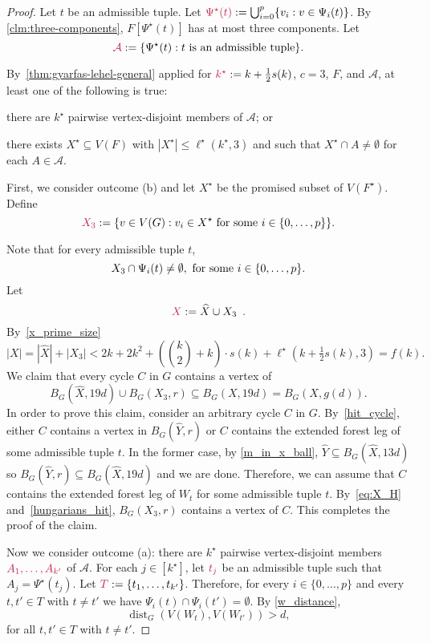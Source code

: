 \documentclass{patmorin}
\DeclareMathOperator{\dist}{dist}
\DeclarePairedDelimiter\set{\{}{\}}
\begin{document}
\begin{proof}
Let $t$ be an admissible tuple.
Let $\mathdefin{\Psi^\star(t)}:=\bigcup_{i=0}^p \{v_i:v\in \Psi_i(t)\}$.
By \cref{clm:three-components}, $F[\Psi^\star(t)]$ has at most three components.
Let
\[
\mathdefin{\mathcal{A}}:=\{\Psi^\star(t):\text{$t$ is an admissible tuple}\}.
\]

By~\cref{thm:gyarfas-lehel-general} applied for
$\mathdefin{k^\star}:=k+\tfrac{1}{2}s(k)$, $c=3$, $F$, and $\mathcal{A}$, at least one of the following is true:
\begin{enumerate*}[label=(\alph*),ref=\alph*]
  \item there are $k^\star$ pairwise vertex-disjoint members of $\mathcal{A}$; or
  \item there exists $X^\star\subseteq V(F)$ with $|X^\star|\leq \ell^\star(k^\star,3)$ and such that $X^\star \cap A\neq\emptyset$ for each $A\in \mathcal{A}$.
\end{enumerate*}

First, we consider outcome (b) and let $X^\star$ be the promised subset of $V(F^\star)$.
Define
\[
\mathdefin{X_3}:=\set{v\in V(G):v_i\in X^\star \textrm{ for some $i\in\set{0,\ldots,p}$}}.
\]


Note that
for every admissible tuple $t$,
\begin{equation}\label{eq:X_H}
X_3 \cap \Psi_i(t) \neq\emptyset,\ \textrm{for some $i\in\set{0,\ldots,p}$.}
\end{equation}
Let
\[
\mathdefin{X}:=\widehat{X} \cup X_3 \enspace .
\]
By~\eqref{x_prime_size}
\[
|X| = |\widehat{X}| + |X_3| < \textstyle 2k + 2k^2 + (\binom{k}{2}+k)\cdot s(k) +  \ell^\star(k+\tfrac{1}{2}s(k),3) = f(k).
\]
We claim that every cycle $C$ in $G$ contains a vertex of
\[
B_G(\widehat{X},19d)\cup B_G(X_3,r)\subseteq B_G(X,19d) = B_G(X,g(d)).
\]
In order to prove this claim, consider an arbitrary cycle $C$ in $G$.
By~\cref{hit_cycle}, either $C$ contains a vertex in $B_G(\widehat{Y},r)$ or $C$ contains the extended forest leg of some admissible tuple $t$.
In the former case, by \eqref{m_in_x_ball}, $\widehat{Y}\subseteq B_G(\widehat{X},13d)$ so $B_G(\widehat{Y},r)\subseteq B_G(\widehat{X},19d)$  and we are done.
Therefore, we can assume that $C$ contains the extended forest leg of $W_t$ for some admissible tuple $t$.
By~\eqref{eq:X_H} and~\cref{hungarians_hit},
$B_G(X_3,r)$ contains a vertex of $C$.
This completes the proof of the claim.

Now we consider outcome (a):
there are $k^\star$ pairwise vertex-disjoint members $\mathdefin{A_1,\ldots,A_{k'}}$ of $\mathcal{A}$.
For each $j\in[k^\star]$, let $\mathdefin{t_j}$ be an admissible tuple such that $A_j = \Psi^\star(t_j)$.
Let $\mathdefin{T}:=\set{t_1,\ldots, t_{k'}}$.
Therefore, for every $i\in\{0,\ldots,p\}$
and every $t,t'\in T$ with $t\neq t'$ we have $\Psi_i(t) \cap \Psi_i(t') = \emptyset$.
By \cref{w_distance},
\begin{equation}\label{eq:Wt-and-Wt-far-apart}
\dist_G(V(W_{t}), V(W_{t'}))> d,
\end{equation}
for all $t,t'\in T$ with $t\neq t'$.


\end{proof}
\end{document}
